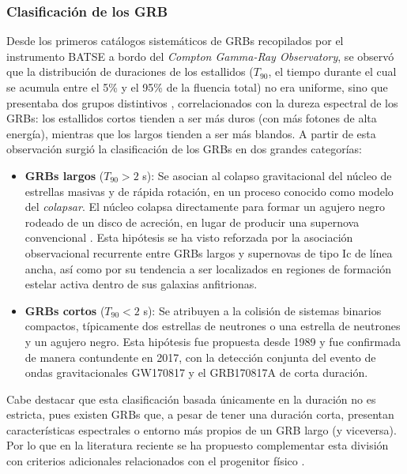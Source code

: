 \subsubsection{Clasificación de los GRB}

Desde los primeros catálogos sistemáticos de GRBs recopilados por el instrumento BATSE a bordo del \textit{Compton Gamma-Ray Observatory}, se observó que la distribución de duraciones de los estallidos ($T_{90}$, el tiempo durante el cual se acumula entre el 5\% y el 95\% de la fluencia total) no era uniforme, sino que presentaba dos grupos distintivos \cite{Kouveliotou1993}, correlacionados con la dureza espectral de los GRBs: los estallidos cortos tienden a ser más duros (con más fotones de alta energía), mientras que los largos tienden a ser más blandos. A partir de esta observación surgió la clasificación de los GRBs en dos grandes categorías:

\begin{itemize}
    \item \textbf{GRBs largos} ($T_{90} > 2$ s): Se asocian al colapso gravitacional del núcleo de estrellas masivas y de rápida rotación, en un proceso conocido como modelo del \textit{colapsar}. El núcleo colapsa directamente para formar un agujero negro rodeado de un disco de acreción, en lugar de producir una supernova convencional \cite{Woosley1993, MacFadyenWoosley1999}. Esta hipótesis se ha visto reforzada por la asociación observacional recurrente entre GRBs largos y supernovas de tipo Ic de línea ancha, así como por su tendencia a ser localizados en regiones de formación estelar activa dentro de sus galaxias anfitrionas.
    
    \item \textbf{GRBs cortos} ($T_{90} < 2$ s): Se atribuyen a la colisión de sistemas binarios compactos, típicamente dos estrellas de neutrones o una estrella de neutrones y un agujero negro. Esta hipótesis fue propuesta desde 1989 \cite{Eichler1989} y fue confirmada de manera contundente en 2017, con la detección conjunta del evento de ondas gravitacionales GW170817 y el GRB170817A de corta duración.
\end{itemize}


Cabe destacar que esta clasificación basada únicamente en la duración no es estricta, pues existen GRBs que, a pesar de tener una duración corta, presentan características espectrales o entorno más propios de un GRB largo (y viceversa). Por lo que en la literatura reciente se ha propuesto complementar esta división con criterios adicionales relacionados con el progenitor físico \cite{Zhang2006}.



